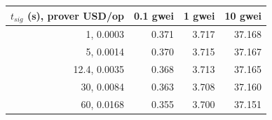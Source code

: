 \begin{tabular}{rrrr}
\toprule
$t_{sig}$ (s), prover USD/op & 0.1 gwei & 1 gwei & 10 gwei \\
\midrule
1, 0.0003 & 0.371 & 3.717 & 37.168 \\
5, 0.0014 & 0.370 & 3.715 & 37.167 \\
12.4, 0.0035 & 0.368 & 3.713 & 37.165 \\
30, 0.0084 & 0.363 & 3.708 & 37.160 \\
60, 0.0168 & 0.355 & 3.700 & 37.151 \\
\bottomrule
\end{tabular}

